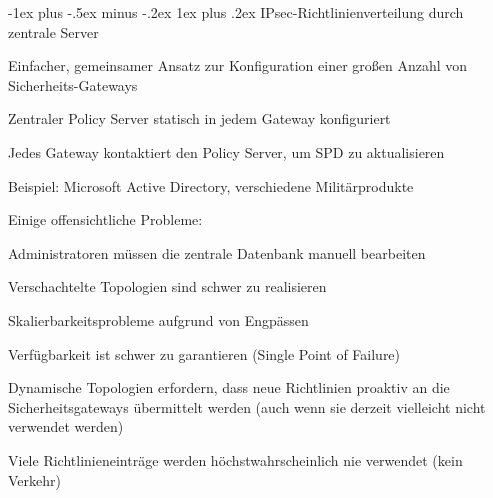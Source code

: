 \documentclass[a4paper]{article}
\makeatletter
\renewcommand{\subsubsection}{\@startsection{subsubsection}{3}{0mm}%
 {-1ex plus -.5ex minus -.2ex}%
 {1ex plus .2ex}%
 {\normalfont\small\bfseries}}
\makeatother
\begin{document}
\begin{multicols}{3}
      \subsubsection{IPsec-Richtlinienverteilung durch zentrale Server}
      \begin{itemize*}
            \item Einfacher, gemeinsamer Ansatz zur Konfiguration einer großen Anzahl von Sicherheits-Gateways
            \item Zentraler Policy Server statisch in jedem Gateway konfiguriert
            \item Jedes Gateway kontaktiert den Policy Server, um SPD zu aktualisieren
            \item Beispiel: Microsoft Active Directory, verschiedene Militärprodukte
            \item Einige offensichtliche Probleme:
            \begin{itemize*}
                  \item Administratoren müssen die zentrale Datenbank manuell bearbeiten
                  \item Verschachtelte Topologien sind schwer zu realisieren
                  \item Skalierbarkeitsprobleme aufgrund von Engpässen
                  \item Verfügbarkeit ist schwer zu garantieren (Single Point of Failure)
                  \item Dynamische Topologien erfordern, dass neue Richtlinien proaktiv an die Sicherheitsgateways übermittelt werden (auch wenn sie derzeit vielleicht nicht verwendet werden)
                  \item Viele Richtlinieneinträge werden höchstwahrscheinlich nie verwendet (kein Verkehr)
            \end{itemize*}
      \end{itemize*}


\end{multicols}
\end{document}
